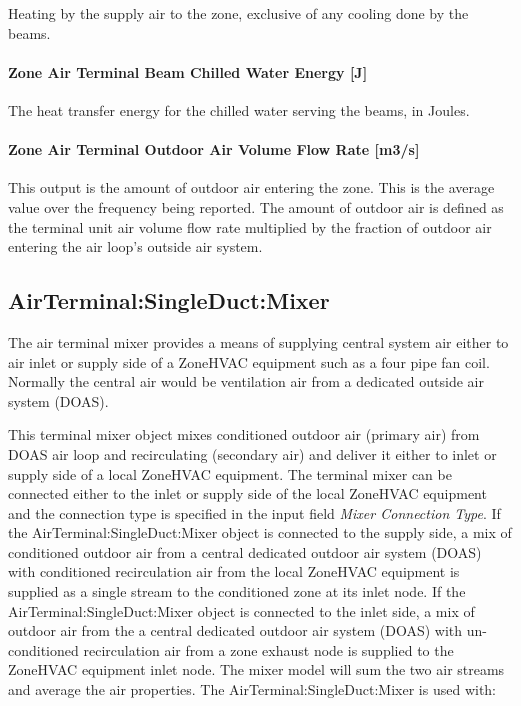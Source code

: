 Heating by the supply air to the zone, exclusive of any cooling done by the beams.

\paragraph{Zone Air Terminal Beam Chilled Water Energy {[}J{]}}\label{zone-air-terminal-beam-chilled-water-energy-j}

The heat transfer energy for the chilled water serving the beams, in Joules.

\paragraph{Zone Air Terminal Outdoor Air Volume Flow Rate {[}m3/s{]}}

This output is the amount of outdoor air entering the zone. This is the average value over the frequency being reported. The amount of outdoor air is defined as the terminal unit air volume flow rate multiplied by the fraction of outdoor air entering the air loop's outside air system.

\subsection{AirTerminal:SingleDuct:Mixer}\label{airterminalsingleductmixer}

The air terminal mixer provides a means of supplying central system air either to air inlet or supply side of a ZoneHVAC equipment such as a four pipe fan coil. Normally the central air would be ventilation air from a dedicated outside air system (DOAS).

This terminal mixer object mixes conditioned outdoor air (primary air) from DOAS air loop and recirculating (secondary air) and deliver it either to inlet or supply side of a local ZoneHVAC equipment. The terminal mixer can be connected either to the inlet or supply side of the local ZoneHVAC equipment and the connection type is specified in the input field \textit{Mixer Connection Type}. If the AirTerminal:SingleDuct:Mixer object is connected to the supply side, a mix of conditioned outdoor air from a central dedicated outdoor air system (DOAS) with conditioned recirculation air from the local ZoneHVAC equipment is supplied as a single stream to the conditioned zone at its inlet node. If the AirTerminal:SingleDuct:Mixer object is connected to the inlet side, a mix of outdoor air from the a central dedicated outdoor air system (DOAS) with un-conditioned recirculation air from a zone exhaust node is supplied to the ZoneHVAC equipment inlet node. The mixer model will sum the two air streams and average the air properties. The AirTerminal:SingleDuct:Mixer is used with:

